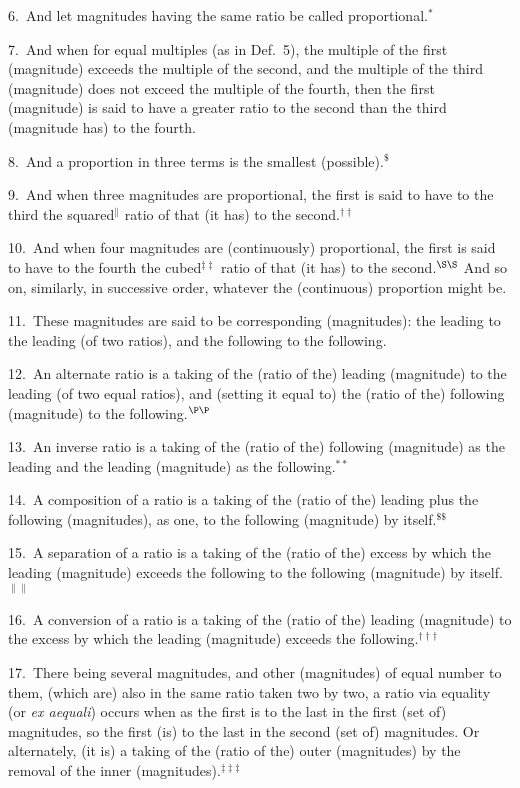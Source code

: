 \begin{Parallel}{}{}
{6.~And let magnitudes having the same ratio be called proportional.$^\ast$

7.~And when for equal multiples (as in Def.~5), the multiple of the first (magnitude) exceeds 
the multiple of the second, and the multiple of the third (magnitude) does not
exceed the multiple of the fourth, then the first (magnitude) is said to have a greater ratio
to the second than the third (magnitude has) to the fourth.

8.~And a  proportion in three terms is the smallest (possible).$^\$$

9.~And when three magnitudes are proportional, the first is said to
have to the third the squared$^\|$ ratio  of that (it has) to the second.$^{\dag\dag}$

10.~And when four magnitudes are (continuously) proportional, the first is said to have to the fourth the cubed$^{\ddag\ddag}$ ratio  of that (it has) to the second.$^{\S\S}$ And  so on,   similarly, in successive order, whatever the (continuous) proportion
might be.

11.~These magnitudes are said to be corresponding (magnitudes):
the leading to the leading (of two ratios), and
the following to the following.

12.~An alternate ratio is a taking of the (ratio of the) leading  (magnitude) to the leading (of two equal ratios), and (setting it equal to) the (ratio of the)
following   (magnitude) to the following.$^{\P\P}$

13.~An inverse  ratio is a taking of the (ratio of the) following (magnitude) as the leading and the leading (magnitude) as the
following.$^{\ast\ast}$

14.~A composition of a  ratio is a taking of the (ratio of the) leading plus the following (magnitudes),
as one, to the  following (magnitude) by itself.$^{\$\$}$

 15.~A separation of a  ratio is a taking of the (ratio of the) excess by which the
 leading (magnitude) exceeds the following to the following (magnitude)
 by itself.$^{\|\|}$
 
16.~A conversion  of a ratio is a taking of the (ratio of the) leading (magnitude) 
 to the excess by which the leading (magnitude) exceeds the following.$^{\dag\dag\dag}$
 
17.~There being several magnitudes,
   and  other (magnitudes)
 of equal  number to them, (which are)  also in
 the same ratio taken two by two,
  a  ratio via equality (or {\em ex aequali}) occurs when  as the first is to the last  in the first (set of) magnitudes, so  the first (is) to the last   in the second (set of) magnitudes. Or alternately, (it is) a taking of the (ratio of the) outer (magnitudes) by the removal of the 
 inner (magnitudes).$^{\ddag\ddag\ddag}$
 
}
\end{Parallel}
